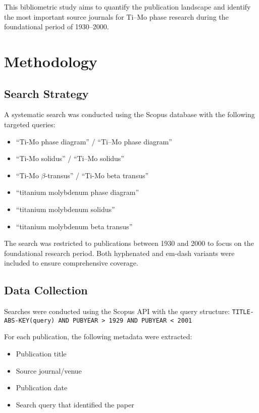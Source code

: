 \documentclass[11pt,a4paper]{article}
\begin{document}
This bibliometric study aims to quantify the publication landscape and identify the most important source journals for Ti--Mo phase research during the foundational period of 1930--2000.

\section{Methodology}

\subsection{Search Strategy}

A systematic search was conducted using the Scopus database with the following targeted queries:
\begin{itemize}
    \item ``Ti-Mo phase diagram'' / ``Ti--Mo phase diagram''
    \item ``Ti-Mo solidus'' / ``Ti--Mo solidus''
    \item ``Ti-Mo $\beta$-transus'' / ``Ti-Mo beta transus''
    \item ``titanium molybdenum phase diagram''
    \item ``titanium molybdenum solidus''
    \item ``titanium molybdenum beta transus''
\end{itemize}

The search was restricted to publications between 1930 and 2000 to focus on the foundational research period. Both hyphenated and em-dash variants were included to ensure comprehensive coverage.

\subsection{Data Collection}

Searches were conducted using the Scopus API with the query structure:
\texttt{TITLE-ABS-KEY(query) AND PUBYEAR > 1929 AND PUBYEAR < 2001}

For each publication, the following metadata were extracted:
\begin{itemize}
    \item Publication title
    \item Source journal/venue
    \item Publication date
    \item Search query that identified the paper
\end{itemize}
\end{document}
